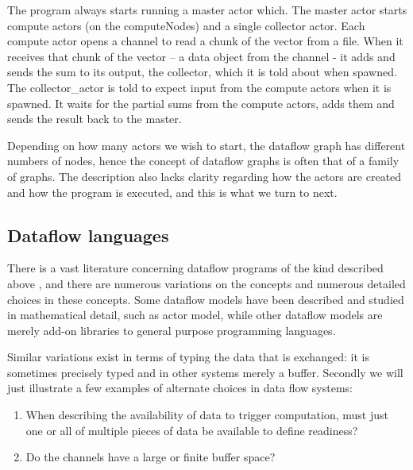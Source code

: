 \documentclass[11pt,a4paper]{article}
\begin{document}
\begin{Example}
The program always starts running a master actor which. The master
actor starts compute actors (on the computeNodes) and a single
collector actor. Each compute actor opens a channel to read a chunk of
the vector from a file. When it receives that chunk of the vector – a
data object from the channel - it adds and sends the sum to its
output, the collector, which it is told about when spawned.  The
collector\_actor is told to expect input from the compute actors when
it is spawned. It waits for the partial sums from the compute actors,
adds them and sends the result back to the master.

Depending on how many actors we wish to start, the dataflow graph has
different numbers of nodes, hence the concept of dataflow graphs is
often that of a family of graphs.  The description also lacks clarity
regarding how the actors are created and how the program is executed,
and this is what we turn to next.

\end{Example}


\subsection{Dataflow languages}

There is a vast literature concerning dataflow programs of the kind
described above \citep[see the review
by][]{Johnston:2004:ADP:1013208.1013209}, and there are numerous
variations on the concepts and numerous detailed choices in these
concepts.  Some dataflow models have been described and studied in
mathematical detail, such as \cite{Hewitt:1973:UMA:1624775.1624804}
actor model, while other dataflow models are merely add-on libraries
to general purpose programming languages.

Similar variations exist in terms of typing the data that is
exchanged: it is sometimes precisely typed and in other systems merely
a buffer. Secondly we will just illustrate a few examples of alternate
choices in data flow systems:
\begin{enumerate}
  \item When describing the availability of data
  to trigger computation, must just one or all of multiple pieces of
  data be available to define readiness?  
\item Do the channels have a large or finite buffer space?
\end{enumerate}
\end{document}
